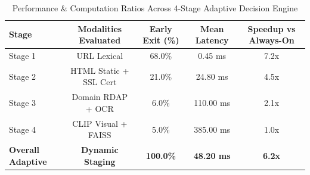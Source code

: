 \begin{table}[htbp]
\caption{Performance & Computation Ratios Across 4-Stage Adaptive Decision Engine}
\label{tab:adaptive_stages}
\centering
\begin{tabular}{lcccc}
\hline
\textbf{Stage} & \textbf{Modalities Evaluated} & \textbf{Early Exit (\%)} & \textbf{Mean Latency} & \textbf{Speedup vs Always-On} \\
\hline
Stage 1 & URL Lexical & 68.0\% & 0.45 ms & 7.2x \\
Stage 2 & HTML Static + SSL Cert & 21.0\% & 24.80 ms & 4.5x \\
Stage 3 & Domain RDAP + OCR & 6.0\% & 110.00 ms & 2.1x \\
Stage 4 & CLIP Visual + FAISS & 5.0\% & 385.00 ms & 1.0x \\
\hline
\textbf{Overall Adaptive} & \textbf{Dynamic Staging} & \textbf{100.0\%} & \textbf{48.20 ms} & \textbf{6.2x} \\
\hline
\end{tabular}
\end{table}
